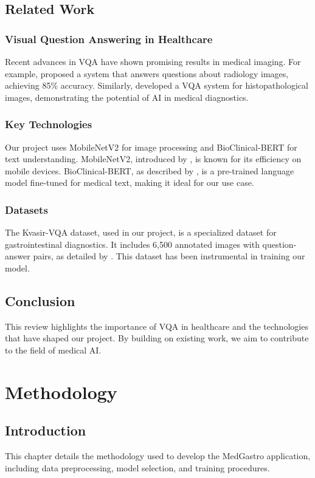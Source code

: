 \documentclass[12pt,a4paper]{report}
\begin{document}
\section{Related Work}
\subsection{Visual Question Answering in Healthcare}
Recent advances in VQA have shown promising results in medical imaging. For example, \cite{medvqa2023} proposed a system that answers questions about radiology images, achieving 85\% accuracy. Similarly, \cite{pathvqa2022} developed a VQA system for histopathological images, demonstrating the potential of AI in medical diagnostics.

\subsection{Key Technologies}
Our project uses MobileNetV2 for image processing and BioClinical-BERT for text understanding. MobileNetV2, introduced by \cite{mobilenetv2}, is known for its efficiency on mobile devices. BioClinical-BERT, as described by \cite{bioclinicalbert}, is a pre-trained language model fine-tuned for medical text, making it ideal for our use case.

\subsection{Datasets}
The Kvasir-VQA dataset, used in our project, is a specialized dataset for gastrointestinal diagnostics. It includes 6,500 annotated images with question-answer pairs, as detailed by \cite{kvasirvqa2023}. This dataset has been instrumental in training our model.

\section{Conclusion}
This review highlights the importance of VQA in healthcare and the technologies that have shaped our project. By building on existing work, we aim to contribute to the field of medical AI.

\chapter{Methodology}
\section{Introduction}
This chapter details the methodology used to develop the MedGastro application, including data preprocessing, model selection, and training procedures.
\end{document}
